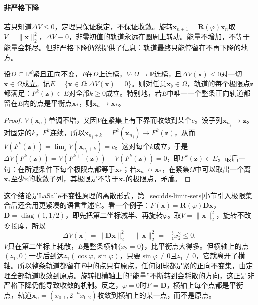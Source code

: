\paragraph{非严格下降}
若只知道$\Delta V\leq0$，定理只保证稳定，不保证收敛。旋转$\bm x_{n+1}=\bm R(\varphi)\bm x_n$取$V=\lVert\bm x\rVert_2^2$，$\Delta V\equiv0$，非零初值的轨道永远在圆周上转动。能量不增加，不等于能量会耗尽。但非严格下降仍然提供了信息：轨道最终只能停留在不再下降的地方。

\begin{theorem}[非严格下降时的极限点]
\label{thm:dds-lasalle}
设$\Omega\subseteq\mathbb R^d$紧且正向不变，$F$在$\Omega$上连续，$V:\Omega\to\mathbb R$连续，且$\Delta V(\bm x)\leq0$对一切$\bm x\in\Omega$成立。记$E=\{\bm x\in\Omega:\Delta V(\bm x)=0\}$。则对任意$\bm x_0\in\Omega$，轨道的每个极限点$\bm z$都满足：$F^k(\bm z)\in E$对全部$k\geq0$成立。特别地，若$E$中唯一一个整条正向轨道都留在$E$内的点是平衡点$\bm x_*$，则$\bm x_n\to\bm x_*$。
\end{theorem}

\begin{proof}
$V(\bm x_n)$单调不增，又因$V$在紧集上有下界而收敛到某个$c$。设子列$\bm x_{n_j}\to\bm z$。对固定的$k$，$F^k$连续，所以$\bm x_{n_j+k}=F^k(\bm x_{n_j})\to F^k(\bm z)$，从而$V(F^k(\bm z))=\lim_jV(\bm x_{n_j+k})=c$。这对每个$k$成立，于是$\Delta V(F^k(\bm z))=V(F^{k+1}(\bm z))-V(F^k(\bm z))=0$，即$F^k(\bm z)\in E$。最后一句：在所述条件下每个极限点都等于$\bm x_*$；若$\bm x_n\not\to\bm x_*$，在紧集$\Omega$中可以取出一个离$\bm x_*$至少$\varepsilon$的收敛子列，其极限是不等于$\bm x_*$的极限点，矛盾。
\end{proof}

这个结论是LaSalle不变性原理的离散形式，第~\ref{sec:dds-limit-sets}小节引入极限集合后还会用更紧凑的语言重述它。看一个例子：$F(\bm x)=\bm R(\varphi)\bm D\bm x$，$\bm D=\operatorname{diag}(1,1/2)$，即先把第二坐标减半、再旋转$\varphi$。取$V=\lVert\bm x\rVert_2^2$，旋转不改变长度，所以
\[
  \Delta V(\bm x)=\lVert\bm D\bm x\rVert_2^2-\lVert\bm x\rVert_2^2=-\tfrac34x_2^2\leq0 .
\]
$V$只在第二坐标上耗散，$E$是整条横轴$\{x_2=0\}$，比平衡点大得多。但横轴上的点$(z_1,0)$一步后到达$z_1(\cos\varphi,\sin\varphi)$，只要$\sin\varphi\neq0$且$z_1\neq0$，它就离开了横轴。所以整条轨道都留在$E$中的点只有原点，任何闭球都是紧的正向不变集，由定理全部轨道收敛到原点。旋转把横轴上的“能量”不断转到会耗散的方向，这正是非严格下降仍能导致收敛的机制。反之，$\varphi=0$时$F=\bm D$，横轴上每个点都是平衡点，轨道$\bm x_n=(x_{0,1},2^{-n}x_{0,2})$收敛到横轴上的某一点，而不是原点。
